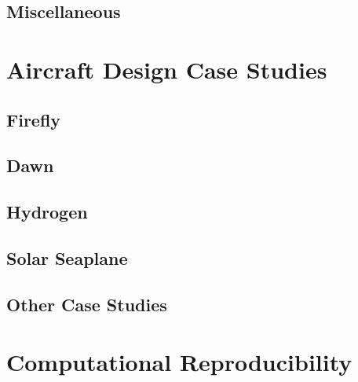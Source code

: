 \subsection{Miscellaneous} %


\section{Aircraft Design Case Studies}


\subsection{Firefly} %

\subsection{Dawn} %

\subsection{Hydrogen} %

\subsection{Solar Seaplane} %

\subsection{Other Case Studies} %


\section{Computational Reproducibility}
\label{sec:asb-reproducibility}
